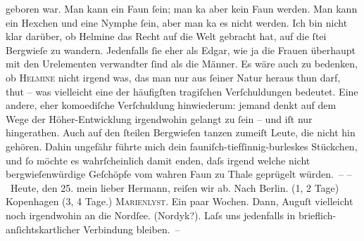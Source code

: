 \begin{ledgroupsized}[t]{13cm}
               geboren war. Man kann ein Faun ſein; man ka{\geminationn}{ }{\pb}aber kein Faun werden.
               Man kann ein Hexchen und eine Nymphe ſein, aber man ka{\geminationn}
               es nicht werden. Ich bin nicht klar darüber, ob Helmine das Recht auf die Welt gebracht hat, auf die
                  ſtei Bergwieſe zu wandern. Jedenfalls ſie eher als Edgar, wie ja die Frauen
               überhaupt mit den Urelementen verwandter ſind als die Männer. Es wäre auch zu
               bedenken, ob \textsc{Helmine} nicht irgend was, das man nur aus {\pb}ſeiner Natur heraus
               thun darf, \label{K_L01604_2v}\label{K_L01604_2h} thut – was
               vielleicht eine der häufigſten tragiſchen Verſchuldungen bedeutet. Eine andere, eher
               komoediſche Verſchuldung hinwiederum: jemand denkt auf dem Wege der \introOben{}Höher-\introOben{}Entwicklung irgendwohin gelangt  zu ſein – und iſt nur \label{K_L01604_3v}\label{K_L01604_3h} hingerathen.
               Auch auf den ſteilen Bergwieſen tanzen zumeiſt Leute, die nicht hin gehören. Dahin
               ungefähr führte mich dein fauniſch-tiefſinnig-burleskes Stückchen, und ſo möchte es wahrſcheinlich damit {\pb}enden, daſs irgend
               welche nicht bergwieſenwürdige Geſchöpfe vom wahren Faun zu Thale geprügelt
               würden. –\pend
           \pstart
           \noindent{}– Heute, \introOben{}den 25.\introOben{} mein lieber Hermann, reiſen wir ab. Nach
                  Berlin. (1, 2 Tage) Kopenhagen (3, 4 Tage.) \textsc{Marienlyst}. Ein paar Wochen. Dann, Auguſt vielleicht noch irgendwohin an die Nordſee. (Nordyk?). Laſs
               uns jedenfalls in brieflich-anſichtskartlicher Verbindung bleiben. – \pend

\end{ledgroupsized}
